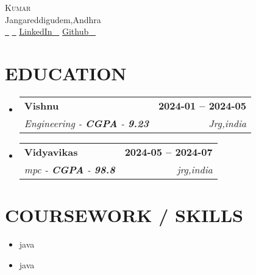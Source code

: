 \documentclass[letterpaper,11pt]{article}
\makeatletter
\newcommand{\resumeSubheading}[4]{
        \vspace{-2pt}\item
          \begin{tabular*}{1.0\textwidth}[t]{l@{\extracolsep{\fill}}r}
            \textbf{\large#1} & \textbf{\small #2} \\
            \textit{\large#3} & \textit{\small #4} \\
            
          \end{tabular*}\vspace{-7pt}
      }
\newcommand{\resumeSubHeadingListStart}{\begin{itemize}[leftmargin=0.0in, label={}]}
\newcommand{\resumeSubHeadingListEnd}{\end{itemize}}
\makeatother
\begin{document}
      
    
        \begin{center}
            {\Huge \scshape Kumar} \\ \vspace{1pt}
            Jangareddigudem,Andhra \\ \vspace{1pt}
            \small \href{tel:+123445}{{} ~} \href{mailto:bhargavvvenkat515@gmail.com}{{} ~} \href{https://linkedin.com}{{\raisebox{-0.2\height} {\underline{LinkedIn}}} ~} \href{https://github.com}{{\raisebox{-0.2\height} {\underline{Github}}} ~}

      
            
            \vspace{-8pt}
        \end{center}
    
        \section{EDUCATION}
        \resumeSubHeadingListStart
          
              \resumeSubheading
                {Vishnu}{2024-01 -- 2024-05}
                {Engineering - \textbf{CGPA} - \textbf{9.23}} {Jrg,india}
            
              \resumeSubheading
                {Vidyavikas}{2024-05 -- 2024-07}
                {mpc - \textbf{CGPA} - \textbf{98.8}} {jrg,india}
            
        \resumeSubHeadingListEnd
    
        \section{COURSEWORK / SKILLS}
        \begin{multicols}{4}
            \begin{itemize}[itemsep=-2pt, parsep=5pt]
                
                    \item java
                  
                    \item java
                  
            \end{itemize}
        \end{multicols}
        \vspace*{2.0\multicolsep}
    
\end{document}
